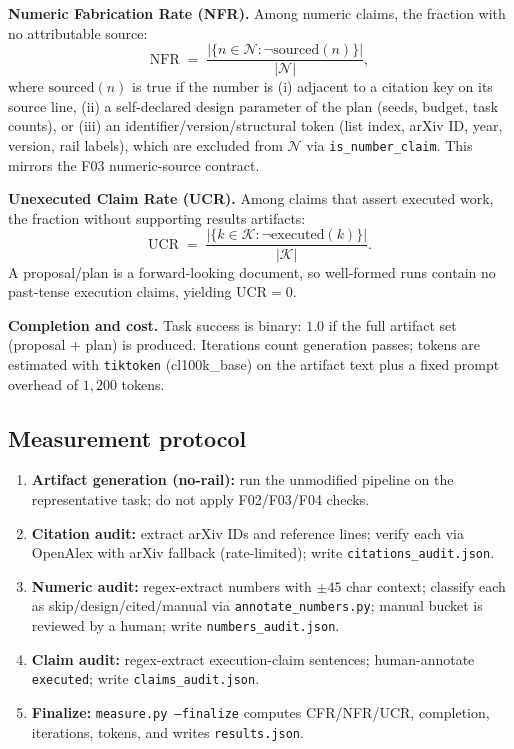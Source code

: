 \documentclass[10pt,twocolumn]{article}
\begin{document}
\textbf{Numeric Fabrication Rate (NFR).} Among numeric claims, the fraction with no attributable source:
\begin{equation}
\mathrm{NFR} \;=\; \frac{|\{n \in \mathcal{N}: \neg \mathrm{sourced}(n)\}|}{|\mathcal{N}|},
\end{equation}
where $\mathrm{sourced}(n)$ is true if the number is (i) adjacent to a citation key on its source line, (ii) a self-declared design parameter of the plan (seeds, budget, task counts), or (iii) an identifier/version/structural token (list index, arXiv ID, year, version, rail labels), which are excluded from $\mathcal{N}$ via \texttt{is\_number\_claim}. This mirrors the F03 numeric-source contract.

\textbf{Unexecuted Claim Rate (UCR).} Among claims that assert executed work, the fraction without supporting results artifacts:
\begin{equation}
\mathrm{UCR} \;=\; \frac{|\{k \in \mathcal{K}: \neg \mathrm{executed}(k)\}|}{|\mathcal{K}|}.
\end{equation}
A proposal/plan is a forward-looking document, so well-formed runs contain no past-tense execution claims, yielding $\mathrm{UCR}=0$.

\textbf{Completion and cost.} Task success is binary: $1.0$ if the full artifact set (proposal + plan) is produced. Iterations count generation passes; tokens are estimated with \texttt{tiktoken} (cl100k\_base) on the artifact text plus a fixed prompt overhead of $1{,}200$ tokens.

\subsection{Measurement protocol}
\begin{enumerate}[leftmargin=*]
\item \textbf{Artifact generation (no-rail):} run the unmodified pipeline on the representative task; do not apply F02/F03/F04 checks.
\item \textbf{Citation audit:} extract arXiv IDs and reference lines; verify each via OpenAlex with arXiv fallback (rate-limited); write \texttt{citations\_audit.json}.
\item \textbf{Numeric audit:} regex-extract numbers with $\pm 45$ char context; classify each as skip/design/cited/manual via \texttt{annotate\_numbers.py}; manual bucket is reviewed by a human; write \texttt{numbers\_audit.json}.
\item \textbf{Claim audit:} regex-extract execution-claim sentences; human-annotate \texttt{executed}; write \texttt{claims\_audit.json}.
\item \textbf{Finalize:} \texttt{measure.py --finalize} computes CFR/NFR/UCR, completion, iterations, tokens, and writes \texttt{results.json}.
\end{enumerate}
\end{document}
